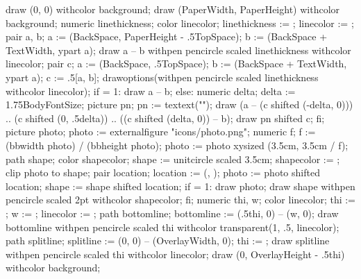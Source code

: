 draw (0, 0) withcolor background;
draw (PaperWidth, PaperHeight) withcolor background;
numeric linethickness; color linecolor;
linethickness := ;
linecolor := ;
pair a, b;
a := (BackSpace, PaperHeight - .5TopSpace);
b := (BackSpace + TextWidth, ypart a);
draw a -- b withpen pencircle scaled linethickness withcolor linecolor;
pair c;
a := (BackSpace, .5TopSpace); b := (BackSpace + TextWidth, ypart a);
c := .5[a, b];
drawoptions(withpen pencircle scaled linethickness withcolor linecolor);
if \number\lastuserpage = 1:
  draw a -- b;
else:
  numeric delta; delta := 1.75BodyFontSize;
  picture pn; pn := textext("{\bf\userpagenumber}");
  draw (a -- (c shifted (-delta, 0)))
          .. (c shifted (0, .5delta)) .. ((c shifted (delta, 0)) -- b);
  draw pn shifted c;
fi;
picture photo;
photo := externalfigure "icons/photo.png";
numeric f;
f := (bbwidth photo) / (bbheight photo);
photo := photo xysized (3.5cm, 3.5cm / f);
path shape; color shapecolor;
shape := unitcircle scaled 3.5cm;
shapecolor := ;
clip photo to shape;
pair location;
location := (, );
photo := photo shifted location;
shape := shape shifted location;
if \number\userpagenumber = 1:
    draw photo;
    draw shape withpen pencircle scaled 2pt withcolor shapecolor;
fi;
\stopuseMPgraphic
{}
\setupbackgrounds[page][background=cvbackground]
numeric thi, w; color linecolor;
thi := ;
w := ;
linecolor := ;
path bottomline;
bottomline := (.5thi, 0) -- (w, 0);
draw bottomline withpen pencircle scaled thi withcolor transparent(1, .5, linecolor);
path splitline;
splitline := (0, 0) -- (OverlayWidth, 0);
thi := ;
draw splitline withpen pencircle scaled thi withcolor linecolor;
draw (0, OverlayHeight - .5thi) withcolor background;
\stopuseMPgraphic
\stopenvironment
